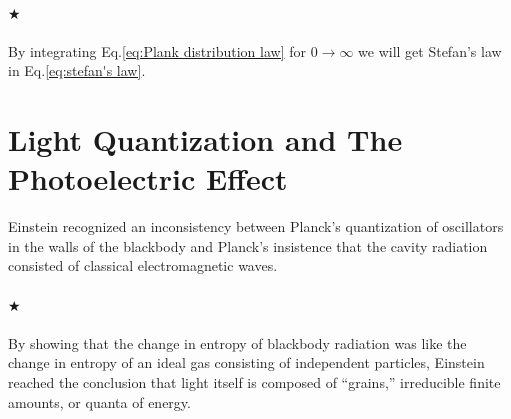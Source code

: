 \documentclass[a4paper]{report}
\begin{document}
            \paragraph{\color{c3}$\bigstar$} By integrating Eq.\eqref{eq:Plank distribution law} for $0 \to \infty$ we will get 
            Stefan’s law in Eq.\eqref{eq:stefan's law}.

        \section{Light Quantization and The Photoelectric Effect}
            Einstein recognized an inconsistency between Planck’s quantization of oscillators in the walls 
            of the blackbody and Planck’s insistence that the cavity radiation consisted of classical electromagnetic waves.

            \paragraph{\color{c3}$\bigstar$} By showing that the change in entropy of blackbody radiation was like 
            the change in entropy of an ideal gas consisting of independent particles, Einstein reached the conclusion 
            that light itself is composed of “grains,” irreducible finite amounts, or quanta of energy.
\end{document}
